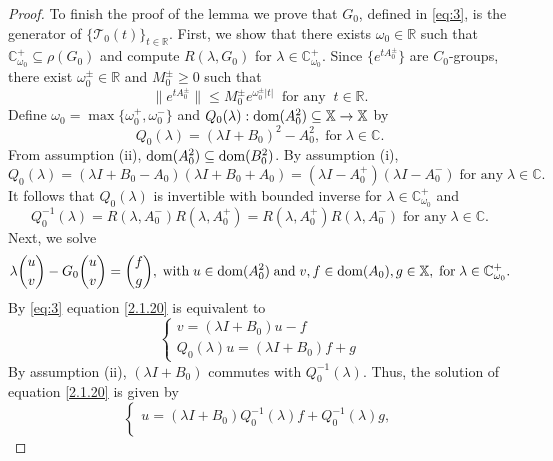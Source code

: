 \documentclass[10pt,a4paper]{amsart}
\newcommand{\CC}{{\mathbb C}}
\newcommand\R{\mathbb R}
\newcommand{\RR}{{\mathbb R}}
\newcommand\bX{{\mathbb X}}
\newcommand\cT{{\mathcal T}}
\newcommand{\dom}{\text{\rm{dom}}}
\begin{document}
\begin{proof}
	To finish the proof of the lemma we prove that $G_0$, defined in \eqref{eq:3}, is the generator of $\{\cT_0(t)\}_{t\in\R}$. First, we show that there exists $\omega_0\in\RR$ such that $\CC_{\omega_0}^+\subseteq\rho(G_0)$ and compute $R(\lambda,G_0)$ for $\lambda\in\CC_{\omega_0}^+$. Since $\{e^{tA_0^\pm}\}$ are $C_0$-groups, there exist $\omega_0^\pm\in\R$ and $M_0^\pm\geq 0$ such that
	\begin{equation}\label{2.1.16}
		\|e^{tA_0^\pm}\|\le M_0^\pm e^{\omega_0^\pm|t|}\;\;\mbox{for any}\;\;t\in\R.
	\end{equation}
	Define $\omega_0=\max\{\omega_0^+,\omega_0^-\}$ and $Q_0(\lambda):\dom(A_0^2)\subseteq\bX\to \bX$ by
	\begin{equation}\label{2.1.17}
		Q_0(\lambda)=(\lambda I+B_0)^2-A_0^2,\;\mbox{for}\;\lambda\in\CC.
	\end{equation}
	From assumption (ii),  $\dom(A_0^2)\subseteq\dom(B_0^2)$. By assumption (i), 
	\begin{equation}\label{2.1.18}
		Q_0(\lambda)=(\lambda I+B_0-A_0)(\lambda I+B_0+A_0)=(\lambda I-A_0^+)(\lambda I-A_0^-)\;\mbox{for any}\;\lambda\in\CC.
	\end{equation}
	It follows that $Q_0(\lambda)$ is invertible with bounded inverse for $\lambda\in\mathbb{C}_{\omega_0}^+$ and 
	\begin{equation}\label{2.1.19}
		Q_0^{-1}(\lambda)=R(\lambda,A_0^-)R(\lambda,A_0^+)=R(\lambda,A_0^+)R(\lambda,A_0^-)\;\mbox{for any}\;\lambda\in\CC.
	\end{equation}
	Next, we solve 
	\begin{equation}\label{2.1.20}
		\lambda\binom{u}{v}-G_0\binom{u}{v}=\binom{f}{g},\;\mbox{with}\; u\in\dom(A_0^2)\;\mbox{and}\; v,f\in\dom(A_0), g\in\bX,\;\mbox{for}\; \lambda\in\mathbb{C}_{\omega_0}^+. 
	\end{equation}
	By \eqref{eq:3} equation \eqref{2.1.20} is equivalent to
	\begin{equation}\label{2.1.21}
		\begin{cases}v=(\lambda I+B_0)u-f\\Q_0(\lambda)u=(\lambda I+B_0)f+g\end{cases}
	\end{equation}
	By assumption (ii), $(\lambda I+B_0)$ commutes with $Q_0^{-1}(\lambda)$. Thus, the solution of equation \eqref{2.1.20} is given by
	\begin{equation}\label{2.1.22}
		\begin{cases}
			u=(\lambda I+B_0)Q_0^{-1}(\lambda)f+Q_0^{-1}(\lambda)g,\\

\end{cases}
\end{equation}
\end{proof}
\end{document}
